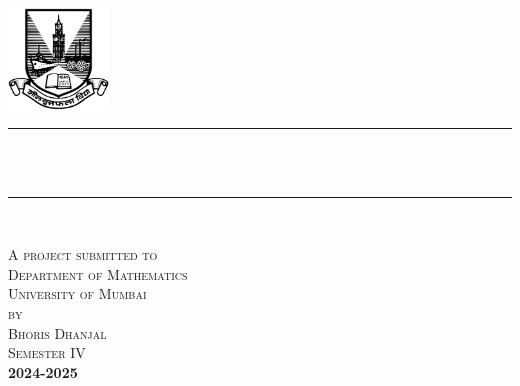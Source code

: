 \begin{titlepage}
	\newcommand{\HRule}{\rule{\linewidth}{0.5mm}} %
	
	
	
	
	\center %
	
	\begin{center}
		
		
		
		
		\includegraphics[width=0.2\textwidth]{uom.png}\\[1.5cm]
		\HRule \\[0.4cm]
		{ \huge \textsc \reporttitle}\\[0.4cm] %
		\HRule \\[2.5cm]
	\end{center}
	\textsc{
		\large A project submitted to\\
		\large Department of Mathematics\\
		\large University of Mumbai\\
		\large by\\[1cm]
		\large Bhoris Dhanjal\\[1em]
		\small Semester IV}\\
	
	\vfill %
	\textbf{
		2024-2025}
			\newpage
		\ 
		\newpage
\end{titlepage}

